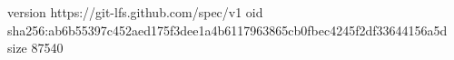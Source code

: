 version https://git-lfs.github.com/spec/v1
oid sha256:ab6b55397c452aed175f3dee1a4b6117963865cb0fbec4245f2df33644156a5d
size 87540
